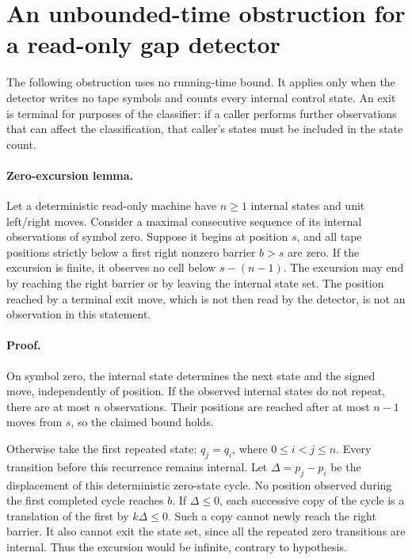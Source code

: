 \section{An unbounded-time obstruction for a read-only gap detector}
\label{sec:read-only-detector}

The following obstruction uses no running-time bound.  It applies only when
the detector writes no tape symbols and counts every internal control state.
An exit is terminal for purposes of the classifier: if a caller performs
further observations that can affect the classification, that caller's states
must be included in the state count.

\paragraph{Zero-excursion lemma.}
Let a deterministic read-only machine have $n\ge1$ internal states and unit
left/right moves.  Consider a maximal consecutive sequence of its internal
observations of symbol zero.  Suppose it begins at position $s$, and all tape
positions strictly below a first right nonzero barrier $b>s$ are zero.
If the excursion is finite, it observes no cell below $s-(n-1)$.
The excursion may end by reaching the right barrier or by leaving the internal
state set.  The position reached by a terminal exit move, which is not then
read by the detector, is not an observation in this statement.

\paragraph{Proof.}
On symbol zero, the internal state determines the next state and the signed
move, independently of position.  If the observed internal states do not
repeat, there are at most $n$ observations.  Their positions are reached after
at most $n-1$ moves from $s$, so the claimed bound holds.

Otherwise take the first repeated state: $q_j=q_i$, where $0\le i<j\le n$.
Every transition before this recurrence remains internal.  Let
$\Delta=p_j-p_i$ be the displacement of this deterministic zero-state cycle.
No position observed during the first completed cycle reaches $b$.
If $\Delta\le0$, each successive copy of the cycle is a translation of the
first by $k\Delta\le0$.  Such a copy cannot newly reach the right barrier.
It also cannot exit the state set, since all the repeated zero transitions are
internal.  Thus the excursion would be infinite, contrary to hypothesis.

